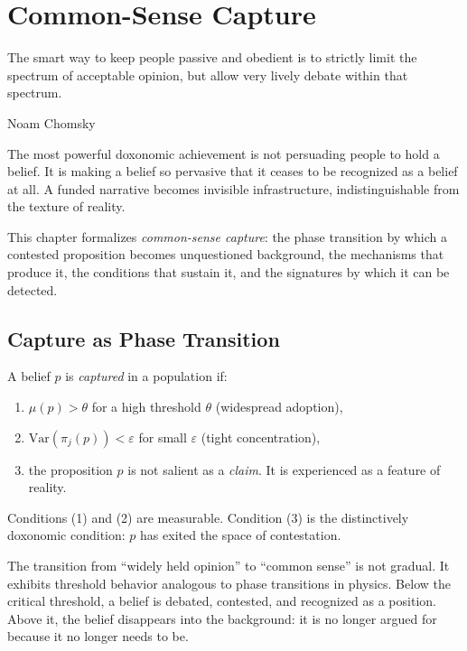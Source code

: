 \chapter{Common-Sense Capture}
\label{ch:common-sense-capture}

\epigraph{The smart way to keep people passive and obedient is to strictly limit the spectrum of acceptable opinion, but allow very lively debate within that spectrum.}{Noam Chomsky}

\noindent
The most powerful doxonomic achievement is not persuading people to hold a belief.
It is making a belief so pervasive that it ceases to be recognized as a belief at all. A funded narrative becomes invisible infrastructure, indistinguishable from the texture of reality.

This chapter formalizes \emph{common-sense capture}: the phase transition by which a contested proposition becomes unquestioned background, the mechanisms that produce it, the conditions that sustain it, and the signatures by which it can be detected.


\section{Capture as Phase Transition}
\label{sec:ch8-phase-transition}

\begin{definition}
\label{def:capture}
A belief $p$ is \emph{captured} in a population if:
\begin{enumerate}[nosep]
  \item $\mu(p) > \theta$ for a high threshold $\theta$ (widespread adoption),
  \item $\mathrm{Var}(\pi_j(p)) < \varepsilon$ for small $\varepsilon$ (tight concentration),
  \item the proposition $p$ is not salient as a \emph{claim}. It is experienced as a feature of reality.
\end{enumerate}
Conditions (1) and (2) are measurable.
Condition (3) is the distinctively doxonomic condition: $p$ has exited the space of contestation.
\end{definition}

The transition from ``widely held opinion'' to ``common sense'' is not gradual.
It exhibits threshold behavior analogous to phase transitions in physics.
Below the critical threshold, a belief is debated, contested, and recognized as a position.
Above it, the belief disappears into the background: it is no longer argued for because it no longer needs to be.


